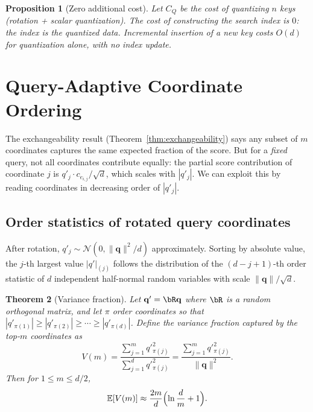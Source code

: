 \documentclass[10pt,twocolumn]{article}
\newtheorem{theorem}{Theorem}[section]
\newtheorem{proposition}[theorem]{Proposition}
\theoremstyle{definition}
\newcommand{\E}{\mathbb{E}}
\newcommand{\calN}{\mathcal{N}}
\newcommand{\bq}{\mathbf{q}}
\begin{document}
\begin{proposition}[Zero additional cost]
  \label{prop:zero_cost}
  Let $C_Q$ be the cost of quantizing $n$ keys (rotation + scalar quantization).
  The cost of constructing the search index is $0$: the index \emph{is} the
  quantized data.  Incremental insertion of a new key costs $O(d)$ for
  quantization alone, with no index update.
\end{proposition}


\section{Query-Adaptive Coordinate Ordering}
\label{sec:ordering}

The exchangeability result (Theorem~\ref{thm:exchangeability}) says any subset
of $m$ coordinates captures the same expected fraction of the score.  But for a
\emph{fixed} query, not all coordinates contribute equally: the partial score
contribution of coordinate $j$ is $q'_j \cdot c_{e_{i,j}} / \sqrt{d}$, which
scales with $|q'_j|$.  We can exploit this by reading coordinates in decreasing
order of $|q'_j|$.

\subsection{Order statistics of rotated query coordinates}

After rotation, $q'_j \sim \calN(0, \|\bq\|^2 / d)$ approximately.  Sorting by
absolute value, the $j$-th largest value $|q'|_{(j)}$ follows the distribution of
the $(d - j + 1)$-th order statistic of $d$ independent half-normal random
variables with scale $\|\bq\| / \sqrt{d}$.

\begin{theorem}[Variance fraction]
  \label{thm:variance_fraction}
  Let $\bq' = \bR \bq$ where $\bR$ is a random orthogonal matrix, and let
  $\pi$ order coordinates so that $|q'_{\pi(1)}| \geq |q'_{\pi(2)}| \geq \cdots
  \geq |q'_{\pi(d)}|$.  Define the variance fraction captured by the top-$m$
  coordinates as
  \begin{equation}
    V(m) = \frac{\sum_{j=1}^{m} q'^2_{\pi(j)}}{\sum_{j=1}^{d} q'^2_{\pi(j)}}
          = \frac{\sum_{j=1}^{m} q'^2_{\pi(j)}}{\|\bq\|^2}.
  \end{equation}
  Then for $1 \leq m \leq d/2$,
  \begin{equation}
    \label{eq:Vm}
    \E[V(m)] \approx \frac{2m}{d}\Bigl(\ln\frac{d}{m} + 1\Bigr).
  \end{equation}
\end{theorem}
\end{document}
